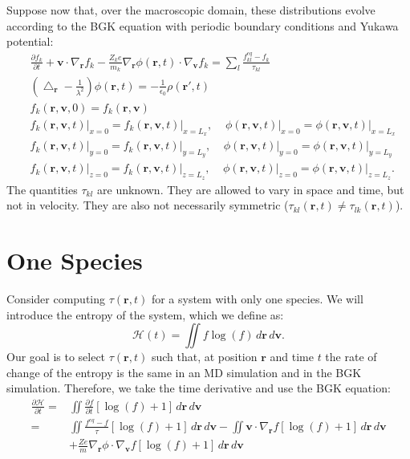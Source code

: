 \documentclass{article}
\begin{document}
Suppose now that, over the macroscopic domain, these distributions evolve according to the BGK equation with periodic boundary conditions and Yukawa potential:
\begin{equation}
\begin{split}
&\frac{\partial f_k}{\partial t}+\mathbf{v}\cdot\nabla_\mathbf{r}f_k-\frac{Z_ke}{m_k}\nabla_\mathbf{r}\phi(\mathbf{r},t)\cdot\nabla_\mathbf{v}f_k=\sum_l\frac{f_{kl}^{eq}-f_k}{\tau_{kl}}\\
&\left(\bigtriangleup_\mathbf{r}-\frac{1}{\lambda^2}\right)\phi(\mathbf{r},t)=-\frac{1}{\epsilon_0}\rho(\mathbf{r}',t)\\
&f_k(\mathbf{r},\mathbf{v},0)=f_{k}(\mathbf{r},\mathbf{v})\\
&\left.f_k(\mathbf{r},\mathbf{v},t)\right|_{x=0}=\left.f_{k}(\mathbf{r},\mathbf{v},t)\right|_{x=L_x},\;\;\;\;
\left.\phi(\mathbf{r},\mathbf{v},t)\right|_{x=0}=\left.\phi(\mathbf{r},\mathbf{v},t)\right|_{x=L_x}\\
&\left.f_k(\mathbf{r},\mathbf{v},t)\right|_{y=0}=\left.f_{k}(\mathbf{r},\mathbf{v},t)\right|_{y=L_y},\;\;\;\;
\left.\phi(\mathbf{r},\mathbf{v},t)\right|_{y=0}=\left.\phi(\mathbf{r},\mathbf{v},t)\right|_{y=L_y}\\
&\left.f_k(\mathbf{r},\mathbf{v},t)\right|_{z=0}=\left.f_{k}(\mathbf{r},\mathbf{v},t)\right|_{z=L_z},\;\;\;\;
\left.\phi(\mathbf{r},\mathbf{v},t)\right|_{z=0}=\left.\phi(\mathbf{r},\mathbf{v},t)\right|_{z=L_z}.
\end{split}
\label{eq:BGK}
\end{equation}
The quantities $\tau_{kl}$ are unknown. They are allowed to vary in space and time, but not in velocity. They are also not necessarily symmetric ($\tau_{kl}(\mathbf{r},t)\neq \tau_{lk}(\mathbf{r},t)$).

\section{One Species}

Consider computing $\tau(\mathbf{r},t)$ for a system with only one species. We will introduce the entropy of the system, which we define as:
\begin{equation}
\mathcal{H}(t)=\iint f\log(f)\,d\mathbf{r}\,d\mathbf{v}.
\end{equation}Our goal is to select $\tau(\mathbf{r},t)$ such that, at position $\mathbf{r}$ and time $t$ the rate of change of the entropy is the same in an MD simulation and in the BGK simulation. Therefore, we take the time derivative and use the BGK equation:
\begin{align*}
\frac{\partial \mathcal{H}}{\partial t}=&\iint \frac{\partial f}{\partial t}[\log(f)+1]\,d\mathbf{r}\,d\mathbf{v}\\
=&\iint \frac{f^{eq}-f}{\tau}[\log(f)+1]\,d\mathbf{r}\,d\mathbf{v}-\iint \mathbf{v}\cdot \nabla_\mathbf{r}f[\log(f)+1]\,d\mathbf{r}\,d\mathbf{v}\\
&+\frac{Ze}{m}\nabla_\mathbf{r}\phi\cdot\nabla_\mathbf{v}f[\log(f)+1]\,d\mathbf{r}\,d\mathbf{v}
\end{align*}
\end{document}

